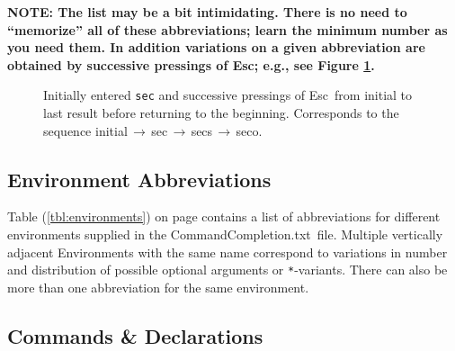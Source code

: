 \documentclass[11pt]{article}
\newcommand{\esckey}{\textsf{Esc}}
\newcommand{\To}{\,\(\to\)\,}
\newcommand{\CCT}{\textsf{CommandCompletion.txt}}
\begin{document}
\textbf{NOTE: The list may be a bit intimidating. There is no need to ``memorize'' all of these abbreviations; learn the minimum number as you need them. In addition variations on a given abbreviation are obtained by successive pressings of \esckey; e.g., see Figure \ref{fig:sec}.}
\begin{figure}\centering
{}
\caption{Initially entered \texttt{sec} and successive pressings of \esckey\ from initial to last result before returning to the beginning. Corresponds to the sequence \textsf{initial}\To\textsf{sec}\To\textsf{secs}\To\textsf{seco}.}
\label{fig:sec}
\end{figure}

\subsection*{Environment Abbreviations}

Table (\ref{tbl:environments}) on page \pageref{tbl:environments} contains a list of abbreviations for different environments supplied in the \CCT\ file. Multiple vertically adjacent Environments with the same name correspond to variations in number and distribution of possible optional arguments or \texttt{*}-variants. There can also be more than one abbreviation for the same environment.

\subsection*{Commands \& Declarations}
\end{document}
